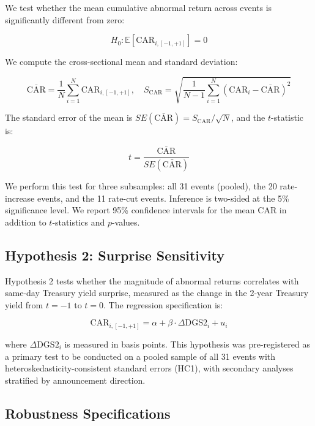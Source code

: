 \documentclass[11pt]{article}
\begin{document}
We test whether the mean cumulative abnormal return across events is significantly different from zero:

\begin{equation}
H_0: \mathbb{E}[\text{CAR}_{i, [-1, +1]}] = 0
\label{eq:h1}
\end{equation}

We compute the cross-sectional mean and standard deviation:

\begin{equation}
\bar{\text{CAR}} = \frac{1}{N} \sum_{i=1}^{N} \text{CAR}_{i, [-1, +1]}, \quad S_{\text{CAR}} = \sqrt{\frac{1}{N-1} \sum_{i=1}^{N} \left( \text{CAR}_i - \bar{\text{CAR}} \right)^2}
\end{equation}

The standard error of the mean is $SE(\bar{\text{CAR}}) = S_{\text{CAR}} / \sqrt{N}$, and the $t$-statistic is:

\begin{equation}
t = \frac{\bar{\text{CAR}}}{SE(\bar{\text{CAR}})}
\end{equation}

We perform this test for three subsamples: all 31 events (pooled), the 20 rate-increase events, and the 11 rate-cut events. Inference is two-sided at the 5\% significance level. We report 95\% confidence intervals for the mean CAR in addition to $t$-statistics and $p$-values.

\subsection{Hypothesis 2: Surprise Sensitivity}

Hypothesis 2 tests whether the magnitude of abnormal returns correlates with same-day Treasury yield surprise, measured as the change in the 2-year Treasury yield from $t=-1$ to $t=0$. The regression specification is:

\begin{equation}
\text{CAR}_{i, [-1, +1]} = \alpha + \beta \cdot \Delta \text{DGS2}_i + u_i
\label{eq:h2}
\end{equation}

where $\Delta \text{DGS2}_i$ is measured in basis points. This hypothesis was pre-registered as a primary test to be conducted on a pooled sample of all 31 events with heteroskedasticity-consistent standard errors (HC1), with secondary analyses stratified by announcement direction.

\subsection{Robustness Specifications}
\end{document}
